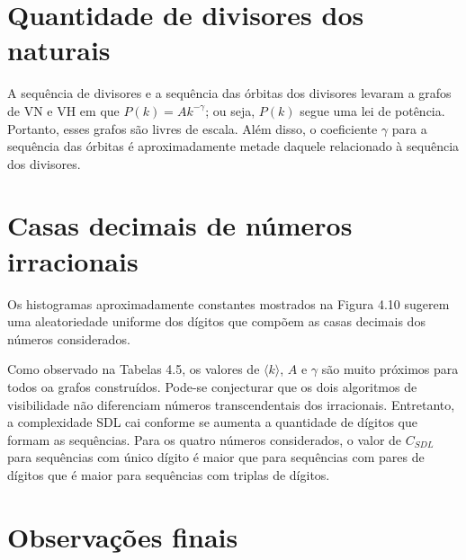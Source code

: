 \documentclass[12pt,a4paper,fleqn]{report}
\begin{document}
\section{Quantidade de divisores dos naturais}

A sequência de divisores e a sequência das órbitas dos divisores levaram a grafos de VN e VH em que
$P(k) = A k^{-\gamma}$; ou seja, $P(k)$ segue uma lei de potência. Portanto, esses  grafos são livres de escala.
Além disso, o  coeficiente $\gamma$ para a sequência das órbitas 
é aproximadamente metade daquele relacionado à sequência dos divisores.






\section{Casas decimais de números irracionais}

Os histogramas aproximadamente constantes mostrados na Figura 4.10 sugerem
uma aleatoriedade uniforme
dos dígitos que compõem as casas decimais dos números  considerados.

Como observado na Tabelas 4.5, os valores de $\langle k \rangle$, $A$ e $\gamma$ são muito próximos para todos oa grafos construídos.
Pode-se conjecturar que
os dois algoritmos de visibilidade não diferenciam números transcendentais
dos irracionais.
Entretanto, a complexidade SDL cai conforme se aumenta a quantidade de dígitos que formam as sequências. Para os quatro números considerados, o valor de $C_{SDL}$ para sequências com único dígito é maior que para sequências com pares de dígitos que é maior para sequências com triplas de dígitos.



\section{Observações finais}
\end{document}
